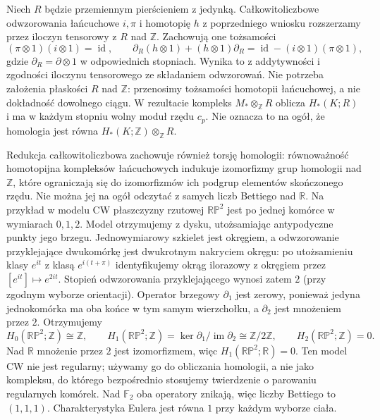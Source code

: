 \begin{uwaga}
Niech $R$ będzie przemiennym pierścieniem z jedynką.
Całkowitoliczbowe odwzorowania łańcuchowe $i,\pi$
i homotopię $h$ z poprzedniego wniosku rozszerzamy
przez iloczyn tensorowy z $R$ nad $\mathbb Z$.
Zachowują one tożsamości
\[
(\pi\otimes 1)(i\otimes 1)=\operatorname{id},
\qquad
\partial_R(h\otimes 1)+(h\otimes 1)\partial_R
=\operatorname{id}-(i\otimes 1)(\pi\otimes 1),
\]
gdzie $\partial_R=\partial\otimes 1$ w odpowiednich
stopniach. Wynika to z addytywności i zgodności
iloczynu tensorowego ze składaniem odwzorowań.
Nie potrzeba założenia płaskości $R$ nad $\mathbb Z$:
przenosimy tożsamości homotopii łańcuchowej,
a nie dokładność dowolnego ciągu.
W rezultacie kompleks $M_*\otimes_{\mathbb Z}R$
oblicza $H_*(K;R)$ i ma w każdym stopniu wolny
moduł rzędu $c_p$. Nie oznacza to na ogół,
że homologia jest równa
$H_*(K;\mathbb Z)\otimes_{\mathbb Z}R$.

Redukcja całkowitoliczbowa zachowuje również torsję
homologii: równoważność homotopijna kompleksów
łańcuchowych indukuje izomorfizmy grup homologii
nad $\mathbb Z$, które ograniczają się do izomorfizmów
ich podgrup elementów skończonego rzędu. Nie można jej na ogół odczytać z samych
liczb Bettiego nad $\mathbb R$. Na przykład w modelu
CW płaszczyzny rzutowej $\mathbb{RP}^2$ jest po jednej
komórce w wymiarach $0,1,2$. Model otrzymujemy z dysku,
utożsamiając antypodyczne punkty jego brzegu.
Jednowymiarowy szkielet jest okręgiem, a odwzorowanie
przyklejające dwukomórkę jest dwukrotnym nakryciem
okręgu: po utożsamieniu klasy $e^{it}$ z klasą
$e^{i(t+\pi)}$ identyfikujemy okrąg ilorazowy
z okręgiem przez $[e^{it}]\mapsto e^{2it}$.
Stopień odwzorowania przyklejającego wynosi zatem $2$
(przy zgodnym wyborze orientacji). Operator brzegowy
$\partial_1$ jest zerowy, ponieważ jedyna jednokomórka
ma oba końce w tym samym wierzchołku, a $\partial_2$
jest mnożeniem przez $2$. Otrzymujemy
\[
 H_0(\mathbb{RP}^2;\mathbb Z)\cong\mathbb Z,\qquad
 H_1(\mathbb{RP}^2;\mathbb Z)
 =\ker\partial_1/\operatorname{im}\partial_2
 \cong\mathbb Z/2\mathbb Z,\qquad
 H_2(\mathbb{RP}^2;\mathbb Z)=0.
\]
Nad $\mathbb R$ mnożenie przez $2$ jest izomorfizmem,
więc $H_1(\mathbb{RP}^2;\mathbb R)=0$. Ten model CW
nie jest regularny; używamy go do obliczania homologii,
a nie jako kompleksu, do którego bezpośrednio
stosujemy twierdzenie o parowaniu regularnych komórek.
Nad $\mathbb F_2$ oba operatory znikają, więc
liczby Bettiego to $(1,1,1)$. Charakterystyka Eulera
jest równa $1$ przy każdym wyborze ciała.
\end{uwaga}

